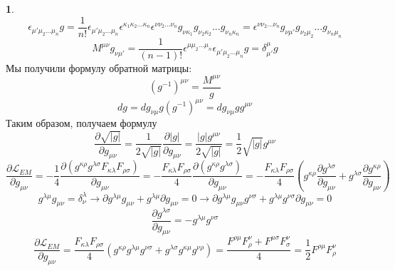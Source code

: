 \documentclass[12pt]{article}
\theoremstyle{definition}
\newtheorem{zad}{}[section]
\begin{document}
\begin{zad}
\begin{equation}
\end{equation}
\begin{equation}
    \epsilon_{\mu'\mu_2...\mu_n}g=\frac{1}{n!}\epsilon_{\mu'\mu_2...\mu_n}\epsilon^{\kappa_1\kappa_2...\kappa_n}\epsilon^{\nu\nu_2...\nu_n}g_{\nu\kappa_1}g_{\nu_2\kappa_2}...g_{\nu_n\kappa_n}=\epsilon^{\nu\nu_2...\nu_n}g_{\nu\mu'}g_{\nu_2\mu_2}...g_{\nu_n\mu_n}
\end{equation}
\begin{equation}
     M^{\mu\nu}g_{\nu\mu'}=\frac{1}{(n-1)!}\epsilon^{\mu\mu_2...\mu_n}\epsilon_{\mu'\mu_2...\mu_n}g=\delta^\mu_{\mu'}g
\end{equation}
Мы получили формулу обратной матрицы:
\begin{equation}
    (g^{-1})^{\mu\nu}=\frac{M^{\mu\nu}}{g}
\end{equation}
\begin{equation}
    dg=dg_{\nu\mu}g(g^{-1})^{\mu\nu}=dg_{\nu\mu}gg^{\mu\nu}
\end{equation}
Таким образом, получаем формулу
\begin{equation}
    \frac{\partial\sqrt{|g|}}{\partial g_{\mu\nu}}=\frac{1}{2\sqrt{|g|}}\frac{\partial|g|}{\partial g_{\mu\nu}}=\frac{|g| g^{\mu\nu}}{2\sqrt{|g|}}=\frac{1}{2}\sqrt{|g|}g^{\mu\nu}
\end{equation}
\begin{equation}
    \frac{\partial\mathcal{L}_{EM}}{\partial g_{\mu\nu}}=-\frac{1}{4}\frac{\partial(g^{\kappa\rho}g^{\lambda\sigma}F_{\kappa\lambda}F_{\rho\sigma})}{\partial g_{\mu\nu}}=-\frac{F_{\kappa\lambda}F_{\rho\sigma}}{4}\frac{\partial(g^{\kappa\rho}g^{\lambda\sigma})}{\partial g_{\mu\nu}}=-\frac{F_{\kappa\lambda}F_{\rho\sigma}}{4}\left(g^{\kappa\rho}\frac{\partial g^{\lambda\sigma}}{\partial g_{\mu\nu}}+g^{\lambda\sigma}\frac{\partial g^{\kappa\rho}}{\partial g_{\mu\nu}}\right)
\end{equation}
\begin{equation}
    g^{\lambda\mu}g_{\mu\nu}=\delta^\lambda_\nu\rightarrow \partial g^{\lambda\mu}g_{\mu\nu}+g^{\lambda\mu}\partial g_{\mu\nu}=0\rightarrow\partial g^{\lambda\mu}g_{\mu\nu}g^{\nu\sigma}+g^{\lambda\mu}g^{\nu\sigma}\partial g_{\mu\nu}=0
\end{equation}
\begin{equation}
    \frac{\partial g^{\lambda\sigma}}{\partial g_{\mu\nu}}=-g^{\lambda\mu}g^{\nu\sigma}
\end{equation}
\begin{equation}
    \frac{\partial\mathcal{L}_{EM}}{\partial g_{\mu\nu}}=\frac{F_{\kappa\lambda}F_{\rho\sigma}}{4}(g^{\kappa\rho}g^{\lambda\mu}g^{\nu\sigma}+g^{\lambda\sigma}g^{\kappa\mu}g^{\nu\rho})=\frac{F^{\rho\mu}F^\nu_\rho+F^{\mu\sigma}F^\nu_\sigma}{4}=\frac{1}{2}F^{\rho\mu}F^\nu_\rho

\end{equation}
\end{zad}
\end{document}
